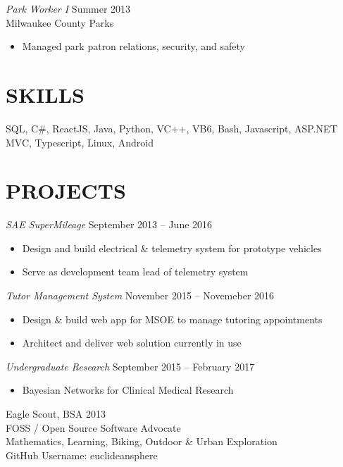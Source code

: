 \documentclass[line,margin]{res}
\begin{document}
\begin{resume}
{\sl Park Worker I} \hfill Summer 2013 \\
Milwaukee County Parks
\begin{itemize}
	\item Managed park patron relations, security, and safety
\end{itemize}

\section{SKILLS}
SQL, C\#, ReactJS, Java, Python, VC++, VB6, Bash, Javascript, ASP.NET MVC, Typescript, Linux, Android \\

\section{PROJECTS}

{\sl SAE SuperMileage} \hfill September 2013 -- June 2016
\begin{itemize}
	\item Design and build electrical \& telemetry system for prototype vehicles
	\item Serve as development team lead of telemetry system
\end{itemize}

{\sl Tutor Management System} \hfill November 2015 -- Novemeber 2016
\begin{itemize}
	\item Design \& build web app for MSOE to manage tutoring appointments
	\item Architect and deliver web solution currently in use
\end{itemize}

{\sl Undergraduate Research} \hfill September 2015 -- February 2017
\begin{itemize}
	\item Bayesian Networks for Clinical Medical Research
\end{itemize}

Eagle Scout, BSA \hfill 2013 \\
FOSS / Open Source Software Advocate \\
Mathematics, Learning, Biking, Outdoor \& Urban Exploration \\
GitHub Username: euclideansphere

\end{resume}
\end{document}
